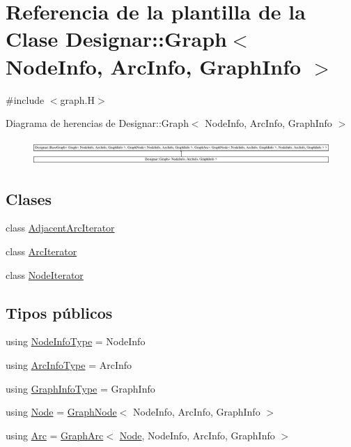 \hypertarget{class_designar_1_1_graph}{}\section{Referencia de la plantilla de la Clase Designar\+:\+:Graph$<$ Node\+Info, Arc\+Info, Graph\+Info $>$}
\label{class_designar_1_1_graph}


{\ttfamily \#include $<$graph.\+H$>$}

Diagrama de herencias de Designar\+:\+:Graph$<$ Node\+Info, Arc\+Info, Graph\+Info $>$\begin{figure}[H]
\begin{center}
\leavevmode
\includegraphics[height=0.952381cm]{class_designar_1_1_graph}
\end{center}
\end{figure}
\subsection*{Clases}
\begin{DoxyCompactItemize}
\item 
class \hyperlink{class_designar_1_1_graph_1_1_adjacent_arc_iterator}{Adjacent\+Arc\+Iterator}
\item 
class \hyperlink{class_designar_1_1_graph_1_1_arc_iterator}{Arc\+Iterator}
\item 
class \hyperlink{class_designar_1_1_graph_1_1_node_iterator}{Node\+Iterator}
\end{DoxyCompactItemize}
\subsection*{Tipos públicos}
\begin{DoxyCompactItemize}
\item 
using \hyperlink{class_designar_1_1_graph_a31ac58ee9562d1695e63449318577032}{Node\+Info\+Type} = Node\+Info
\item 
using \hyperlink{class_designar_1_1_graph_abc2adb4841a6d092d5093f9e60f2c8be}{Arc\+Info\+Type} = Arc\+Info
\item 
using \hyperlink{class_designar_1_1_graph_a5b6ad505f3b0f5a5cd288a13bebf2d27}{Graph\+Info\+Type} = Graph\+Info
\item 
using \hyperlink{class_designar_1_1_graph_a5dfc7dba9d092ac489c72e40390c37d0}{Node} = \hyperlink{class_designar_1_1_graph_node}{Graph\+Node}$<$ Node\+Info, Arc\+Info, Graph\+Info $>$
\item 
using \hyperlink{class_designar_1_1_graph_a74c730ef4ce2d20f998d72bd25c2b5bf}{Arc} = \hyperlink{class_designar_1_1_graph_arc}{Graph\+Arc}$<$ \hyperlink{class_designar_1_1_graph_a5dfc7dba9d092ac489c72e40390c37d0}{Node}, Node\+Info, Arc\+Info, Graph\+Info $>$
\end{DoxyCompactItemize}
